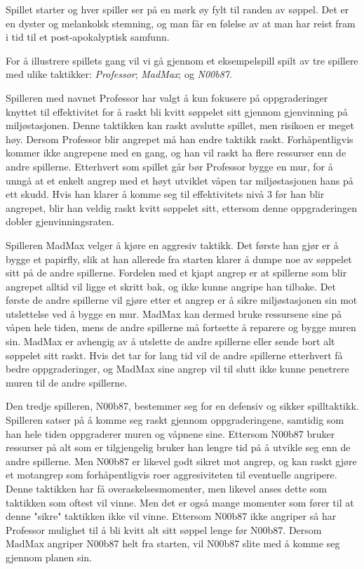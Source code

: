 Spillet starter og hver spiller ser på en mørk øy fylt til randen av søppel. Det er en dyster og melankolsk stemning, og man får en følelse av at man har reist fram i tid til et post-apokalyptisk samfunn.

For å illustrere spillets gang vil vi gå gjennom et eksempelspill spilt av tre spillere med ulike taktikker: \emph{Professor}; \emph{MadMax}; og \emph{N00b87}.

Spilleren med navnet Professor har valgt å kun fokusere på oppgraderinger knyttet til effektivitet for å raskt bli kvitt søppelet sitt gjennom gjenvinning på miljøstasjonen. Denne taktikken kan raskt avslutte spillet, men risikoen er meget høy. Dersom Professor blir angrepet må han endre taktikk raskt. Forhåpentligvis kommer ikke angrepene med en gang, og han vil raskt ha flere ressurser enn de andre spillerne. Etterhvert som spillet går bør Professor bygge en mur, for å unngå at et enkelt angrep med et høyt utviklet våpen tar miljøstasjonen hans på ett skudd. Hvis han klarer å komme seg til effektivitets nivå 3 før han blir angrepet, blir han veldig raskt kvitt søppelet sitt, ettersom denne oppgraderingen dobler gjenvinningsraten. 

Spilleren MadMax velger å kjøre en aggresiv taktikk. Det første han gjør er å bygge et papirfly, slik at han allerede fra starten klarer å dumpe noe av søppelet sitt på de andre spillerne. Fordelen med et kjapt angrep er at spillerne som blir angrepet alltid vil ligge et skritt bak, og ikke kunne angripe han tilbake. Det første de andre spillerne vil gjøre etter et angrep er å sikre miljøstasjonen sin mot utslettelse ved å bygge en mur. MadMax kan dermed bruke ressursene sine på våpen hele tiden, mens de andre spillerne må fortsette å reparere og bygge muren sin. MadMax er avhengig av å utslette de andre spillerne eller sende bort alt søppelet sitt raskt. Hvis det tar for lang tid vil de andre spillerne etterhvert få bedre oppgraderinger, og MadMax sine angrep vil til slutt ikke kunne penetrere muren til de andre spillerne.

Den tredje spilleren, N00b87, bestemmer seg for en defensiv og sikker spilltaktikk. Spilleren satser på å komme seg raskt gjennom oppgraderingene, samtidig som han hele tiden oppgraderer muren og våpnene sine. Ettersom N00b87 bruker ressurser på alt som er tilgjengelig bruker han lengre tid på å utvikle seg enn de andre spillerne. Men N00b87 er likevel godt sikret mot angrep, og kan raskt gjøre et motangrep som forhåpentligvis roer aggresiviteten til eventuelle angripere. Denne taktikken har få overaskelsesmomenter, men likevel anses dette som taktikken som oftest vil vinne. Men det er også mange momenter som fører til at denne "sikre" taktikken ikke vil vinne. Ettersom N00b87 ikke angriper så har Professor mulighet til å bli kvitt alt sitt søppel lenge før N00b87. Dersom MadMax angriper N00b87 helt fra starten, vil N00b87 slite med å komme seg gjennom planen sin. 

